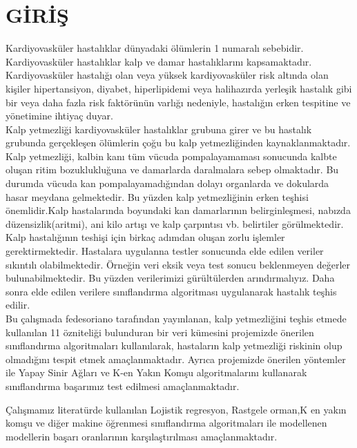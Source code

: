 \documentclass[conference]{IEEEtran}
\begin{document}
\section{GİRİŞ}
Kardiyovasküler hastalıklar dünyadaki ölümlerin 1 numaralı sebebidir. Kardiyovasküler hastalıklar kalp ve damar hastalıklarını kapsamaktadır. Kardiyovasküler hastalığı olan veya yüksek kardiyovasküler risk altında olan kişiler hipertansiyon, diyabet, hiperlipidemi veya halihazırda yerleşik hastalık gibi bir veya daha fazla risk faktörünün varlığı nedeniyle, hastalığın erken tespitine ve yönetimine ihtiyaç duyar\cite{kaggle}.\\

Kalp yetmezliği kardiyovasküler hastalıklar grubuna girer ve bu hastalık grubunda gerçekleşen ölümlerin çoğu bu kalp yetmezliğinden kaynaklanmaktadır. Kalp yetmezliği, kalbin kanı tüm vücuda pompalayamaması sonucunda kalbte oluşan ritim bozuklukluğuna ve damarlarda daralmalara sebep olmaktadır. Bu durumda vücuda kan pompalayamadığından dolayı organlarda ve dokularda hasar meydana gelmektedir. Bu yüzden kalp yetmezliğinin erken teşhisi önemlidir.Kalp hastalarında boyundaki kan damarlarının belirginleşmesi, nabızda düzensizlik(aritmi), ani kilo artışı ve kalp çarpıntısı vb. belirtiler görülmektedir.\\

Kalp hastalığının teshişi için birkaç adımdan oluşan zorlu işlemler gerektirmektedir. Hastalara uygulanna testler sonucunda elde edilen veriler sıkıntılı olabilmektedir. Örneğin veri eksik veya test sonucu beklenmeyen değerler bulunabilmektedir. Bu yüzden verilerimizi gürültülerden arındırmalıyız. Daha sonra elde edilen verilere sınıflandırma algoritması uygulanarak hastalık teşhis edilir.\\

Bu çalışmada fedesoriano tarafından yayınlanan, kalp yetmezliğini teşhis etmede kullanılan 11 özniteliği bulunduran bir veri kümesini projemizde önerilen sınıflandırma algoritmaları kullanılarak, hastaların kalp yetmezliği riskinin olup olmadığını tespit etmek amaçlanmaktadır\cite{data_author}. Ayrıca projemizde önerilen yöntemler ile Yapay Sinir Ağları ve K-en Yakın Komşu algoritmalarını kullanarak sınıflandırma başarımız test edilmesi amaçlanmaktadır.

Çalışmamız literatürde kullanılan Lojistik regresyon, Rastgele orman,K en yakın komşu ve diğer makine öğrenmesi sınıflandırma algoritmaları ile modellenen modellerin başarı oranlarının karşılaştırılması amaçlanmaktadır.
\end{document}
